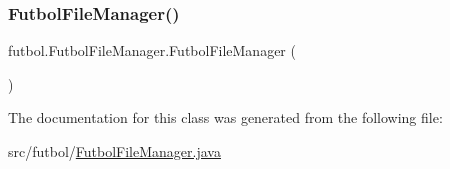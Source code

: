 \subsubsection{\texorpdfstring{Futbol\+File\+Manager()}{FutbolFileManager()}}
{\footnotesize\ttfamily futbol.\+Futbol\+File\+Manager.\+Futbol\+File\+Manager (\begin{DoxyParamCaption}{ }\end{DoxyParamCaption})}



The documentation for this class was generated from the following file\+:\begin{DoxyCompactItemize}
\item 
src/futbol/\hyperlink{_futbol_file_manager_8java}{Futbol\+File\+Manager.\+java}\end{DoxyCompactItemize}
